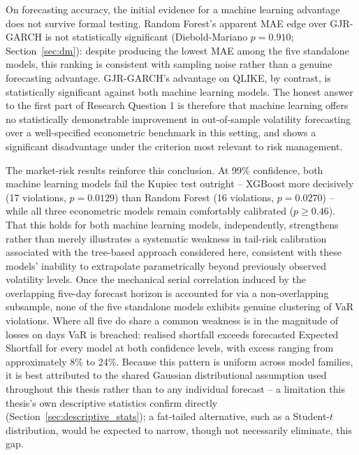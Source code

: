 \documentclass[12pt,a4paper]{article}
\begin{document}
On forecasting accuracy, the initial evidence for a machine learning advantage does not survive
formal testing. Random Forest's apparent MAE edge over GJR-GARCH is not statistically significant
(Diebold-Mariano $p=0.910$; Section~\ref{sec:dm}): despite producing the lowest MAE among the five
standalone models, this ranking is consistent with sampling noise rather than a genuine forecasting
advantage. GJR-GARCH's advantage on QLIKE, by contrast, is statistically significant against both
machine learning models. The honest answer to the first part of Research Question 1 is therefore
that machine learning offers no statistically demonstrable improvement in out-of-sample volatility
forecasting over a well-specified econometric benchmark in this setting, and shows a significant
disadvantage under the criterion most relevant to risk management.

The market-risk results reinforce this conclusion. At 99\% confidence, both machine learning
models fail the Kupiec test outright -- XGBoost more decisively (17 violations, $p=0.0129$) than
Random Forest (16 violations, $p=0.0270$) -- while all three econometric models remain comfortably
calibrated ($p \geq 0.46$). That this holds for both machine learning models, independently,
strengthens rather than merely illustrates a systematic weakness in tail-risk calibration
associated with the tree-based approach considered here, consistent with these models' inability
to extrapolate parametrically beyond previously observed volatility levels. Once the mechanical
serial correlation induced by the overlapping five-day forecast horizon is accounted for via a
non-overlapping subsample, none of the five standalone models exhibits genuine clustering of VaR
violations. Where all five do share a common weakness is in the magnitude of losses on days VaR is
breached: realised shortfall exceeds forecasted Expected Shortfall for every model at both
confidence levels, with excess ranging from approximately 8\% to 24\%. Because this pattern is
uniform across model families, it is best attributed to the shared Gaussian distributional
assumption used throughout this thesis rather than to any individual forecast -- a limitation this
thesis's own descriptive statistics confirm directly (Section~\ref{sec:descriptive_stats}); a
fat-tailed alternative, such as a Student-$t$ distribution, would be expected to narrow, though not
necessarily eliminate, this gap.
\end{document}
